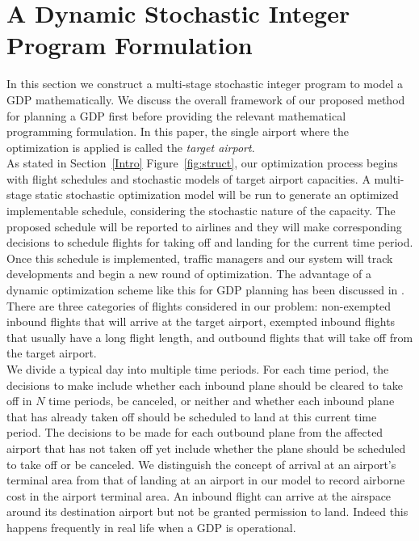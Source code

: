 \documentclass[12pt]{article}
\begin{document}
\section{A Dynamic Stochastic Integer Program Formulation}\label{Model}
	In this section we construct a multi-stage stochastic integer program to model a GDP mathematically. We discuss the overall framework of our proposed method for planning a GDP first before providing the relevant mathematical programming formulation.  In this paper, the single airport where the optimization is applied is called the {\em target airport}.\\
	\newline As stated in Section~\ref{Intro} Figure~\ref{fig:struct}, our optimization process begins with flight schedules and stochastic models of target airport capacities. A multi-stage static stochastic optimization model will be run to generate an optimized implementable schedule, considering the stochastic nature of the capacity. The proposed schedule will be reported to airlines and they will make corresponding decisions to schedule flights for taking off and landing for the current time period. Once this schedule is implemented, traffic managers and our system will track developments and begin a new round of optimization. The advantage of a dynamic optimization scheme like this for GDP planning has been discussed in \cite{richetta1994dynamic}. \\
	\newline There are three categories of flights considered in our problem: non-exempted inbound flights that will arrive at the target airport, exempted inbound flights that usually have a long flight length, and outbound flights that will take off from the target airport. \\
	\newline
	We divide a typical day into multiple time periods. For each time period, the decisions to make include whether each inbound plane should be cleared to take off in \(N\) time periods, be canceled, or neither and whether each inbound plane that has already taken off should be scheduled to land at this current time period. The decisions to be made for each outbound plane from the affected airport that has not taken off yet include whether the plane should be scheduled to take off or be canceled. We distinguish the concept of arrival at an airport's terminal area from that of landing at an airport in our model to record airborne cost in the airport terminal area. An inbound flight can arrive at the airspace around its destination airport but not be granted permission to land.  Indeed this happens frequently in real life when a GDP is operational.
\end{document}
